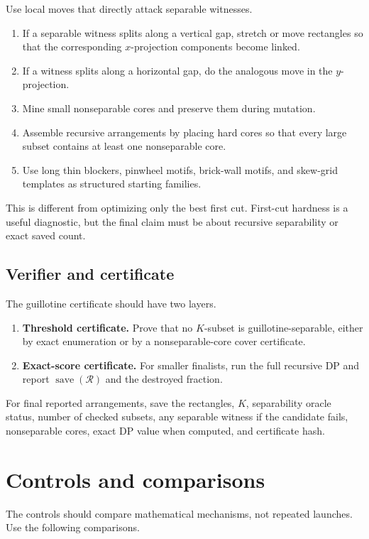 \documentclass[11pt]{article}
\newcommand{\Rcal}{\mathcal{R}}
\newcommand{\save}{\operatorname{save}}
\begin{document}
Use local moves that directly attack separable witnesses.
\begin{enumerate}
\item If a separable witness splits along a vertical gap, stretch or move
rectangles so that the corresponding $x$-projection components become linked.
\item If a witness splits along a horizontal gap, do the analogous move in the
$y$-projection.
\item Mine small nonseparable cores and preserve them during mutation.
\item Assemble recursive arrangements by placing hard cores so that every
large subset contains at least one nonseparable core.
\item Use long thin blockers, pinwheel motifs, brick-wall motifs, and
skew-grid templates as structured starting families.
\end{enumerate}

This is different from optimizing only the best first cut.  First-cut hardness
is a useful diagnostic, but the final claim must be about recursive
separability or exact saved count.

\subsection{Verifier and certificate}

The guillotine certificate should have two layers.

\begin{enumerate}
\item \textbf{Threshold certificate.}  Prove that no $K$-subset is
guillotine-separable, either by exact enumeration or by a nonseparable-core
cover certificate.
\item \textbf{Exact-score certificate.}  For smaller finalists, run the full
recursive DP and report $\save(\Rcal)$ and the destroyed fraction.
\end{enumerate}

For final reported arrangements, save the rectangles, $K$, separability oracle
status, number of checked subsets, any separable witness if the candidate
fails, nonseparable cores, exact DP value when computed, and certificate hash.

\section{Controls and comparisons}

The controls should compare mathematical mechanisms, not repeated launches.
Use the following comparisons.
\end{document}
